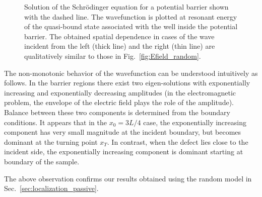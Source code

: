\begin{figure}%
\vskip -0.8cm
\centerline{}
\caption[Solution of the Schr\"{o}dinger equation for a potential barrier shown with the dashed line.]{Solution of the Schr\"{o}dinger equation for a potential barrier shown with the dashed line. The wavefunction is plotted at resonant energy of the quasi-bound state associated with the well inside the potential barrier. The obtained spatial dependence in cases of the wave incident from the left (thick line) and the right (thin line) are qualitatively similar to those in Fig.~\ref{fig:Efield_random}.\label{fig:barrierdefectlog}}
\end{figure}

The non-monotonic behavior of the wavefunction can be understood intuitively as follows. In the barrier regions there exist two eigen-solutions with exponentially increasing and exponentially decreasing amplitudes (in the electromagnetic problem, the envelope of the electric field plays the role of the amplitude). Balance between these two components is determined from the boundary conditions. It appears that in the $x_0=3L/4$ case, the exponentially increasing component has very small magnitude at the incident boundary, but becomes dominant at the turning point $x_T$. In contrast, when the defect lies close to the incident side, the exponentially increasing component is dominant starting at boundary of the sample.

The above observation confirms our results obtained using the random model in Sec.~\ref{sec:localization_passive}.

%
%
%

%
